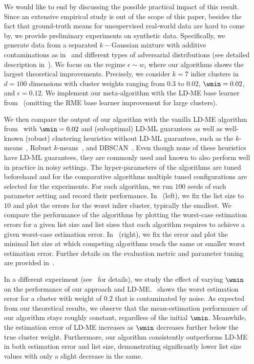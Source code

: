 We would like to end by discussing the possible practical impact of this result. 
Since an extensive empirical study is out of the scope of this paper, 
besides the fact that ground-truth means for unsupervised real-world data are hard to come by, we provide preliminary experiments on synthetic data.
Specifically, we generate data from a separated $k-$Gaussian mixture with additive contaminations as in~ and different types of adversarial distributions (see detailed description in~). We focus on the regime
$\epsilon \sim w_i$ where our algorithms shows the largest theoretical improvements. Precisely, we consider \(k = 7\) inlier clusters in \(d = 100\) dimensions with cluster weights ranging from \(0.3\) to \(0.02\), \(\wmin = 0.02\), and \(\epsilon = 0.12\).
We implement our meta-algorithm with the LD-ME base learner from~\cite{diakonikolas2022clustering} (omitting the RME base learner improvement for large clusters). 

We then compare the output of our algorithm with the vanilla LD-ME algorithm from~\cite{diakonikolas2022clustering} with $\wmin=0.02$ and (suboptimal) LD-ML guarantees as well as
well-known (robust) clustering heuristics without LD-ML guarantees,
such as the $k$-means~\citep{lloyd1982least}, Robust $k$-means~\citep{brownlees2015empirical}, and DBSCAN~\citep{ester1996density}. 
Even though none of these heuristics  have LD-ML guarantees, they are commonly used and known to also perform well in practice in noisy settings. The hyper-parameters of the algorithms are tuned beforehand and for the comparative algorithms multiple tuned configurations are selected for the experiments.
For each algorithm, we run \(100\) seeds of each parameter setting and record their performance. 
In~ (left), we fix the list size to \(10\) and plot the errors for the worst inlier cluster, typically the smallest. 
We compare the performance of the algorithms by plotting the worst-case estimation errors for a given list size and list sizes that each algorithm requires to achieve a given worst-case estimation error.
In~ (right), we fix the error and plot the minimal list size at which competing algorithms reach the same or smaller worst estimation error. Further details on the evaluation metric and parameter tuning are provided in~.

In a different experiment (see~ for details), we study the effect of varying \(\wmin\) on the performance of our approach and LD-ME.~ shows the worst estimation error for a cluster with weight of \(0.2\) that is contaminated by noise. As expected from our theoretical results, we observe that the mean-estimation performance of our algorithm stays roughly constant, regardless of the initial \(\wmin\). Meanwhile, the estimation error of LD-ME increases as \(\wmin\) decreases further below  the true cluster weight. 
Furthermore, our algorithm consistently outperforms LD-ME in both estimation error and list size, demonstrating significantly lower list size values with only a slight decrease in the same. 


